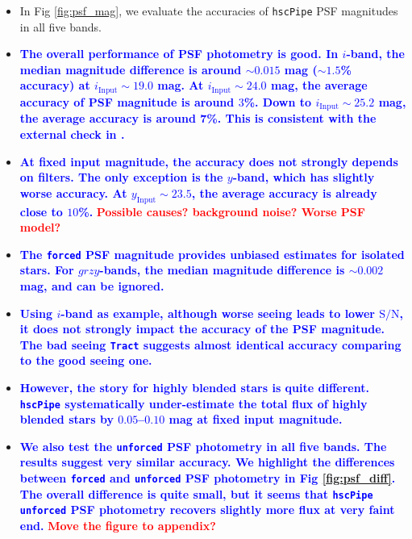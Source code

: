\documentclass[useamsfonts]{pasj01}
\def\hscpipe{\texttt{hscPipe}}
\def\forced{\texttt{forced}}
\def\unforced{\texttt{unforced}}
\def\tract{\texttt{Tract}}
\newcommand{\plan}[1]{\textcolor{blue} {\textbf{#1}}}
\newcommand{\todo}[1]{\textcolor{red} {\textbf{#1}}}
\begin{document}
    \begin{itemize}
    
        \item In Fig \ref{fig:psf_mag}, we evaluate the accuracies of \hscpipe{} PSF 
            magnitudes in all five bands.
            
        \item \plan{The overall performance of PSF photometry is good. 
            In $i$-band, the median magnitude difference is around ${\sim}0.015$ mag
            (${\sim}1.5$\% accuracy) at $i_{\mathrm{Input}}{\sim}19.0$ mag. 
            At $i_{\mathrm{Input}}{\sim}24.0$ mag, the average accuracy of PSF 
            magnitude is around $3$\%. 
            Down to $i_{\mathrm{Input}}{\sim}25.2$ mag, the average accuracy is 
            around 7\%.
            This is consistent with the external check in \citet{HSCDR1}.}
            
        \item \plan{At fixed input magnitude, the accuracy does not strongly depends
            on filters. 
            The only exception is the $y$-band, which has slightly worse accuracy. 
            At $y_{\mathrm{Input}}{\sim}23.5$, the average accuracy is already close 
            to $10$\%.}
            \todo{Possible causes? background noise? Worse PSF model?}
            
       \item \plan{The \forced{} PSF magnitude provides unbiased estimates for
           isolated stars. 
           For $grzy$-bands, the median magnitude difference is ${\sim}0.002$ mag, 
           and can be ignored.}
           
       \item \plan{Using $i$-band as example, although worse seeing leads to 
           lower $\mathrm{S}/\mathrm{N}$, it does not strongly impact the 
           accuracy of the PSF magnitude. 
           The bad seeing \tract{} suggests almost identical accuracy comparing
           to the good seeing one.}
           
       \item \plan{However, the story for highly blended stars is quite different. 
           \hscpipe{} systematically under-estimate the total flux of highly blended
           stars by $0.05$--$0.10$ mag at fixed input magnitude.}
           
       \item \plan{We also test the \unforced{} PSF photometry in all five 
           bands. 
           The results suggest very similar accuracy.
           We highlight the differences between \forced{} and 
           \unforced{} PSF photometry in Fig \ref{fig:psf_diff}. 
           The overall difference is quite small, but it seems that \hscpipe{} 
           \unforced{} PSF photometry recovers slightly more flux at very 
           faint end.} 
           \todo{Move the figure to appendix?}
    
    \end{itemize}
\end{document}

